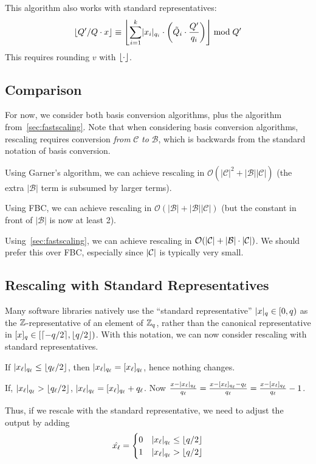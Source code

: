 \documentclass[../../fheimpl.tex]{subfiles}
\begin{document}
This algorithm also works with standard representatives:
\[\floor{Q'/Q\cdot x} \equiv \floor*{\sum_{i=1}^k \abs{x_i}_{q_i}\cdot\parens*{\tilde{Q}_i\cdot\frac{Q'}{q_i}}} \bmod Q'\]
This requires rounding $v$ with $\floor{\cdot}$.

\subsection{Comparison}
For now, we consider both basis conversion algorithms, plus the algorithm from~\cref{sec:fastscaling}. Note that when considering basis conversion algorithms, rescaling requires conversion \emph{from} $\mathcal{C}$ \emph{to} $\mathcal{B}$, which is backwards from the standard notation of basis conversion.

Using Garner's algorithm, we can achieve rescaling in $\mathcal{O}(|\mathcal{C}|^2+|\mathcal{B}||\mathcal{C}|)$ (the extra $|\mathcal{B}|$ term is subsumed by larger terms).

Using FBC, we can achieve rescaling in $\mathcal{O}(|\mathcal{B}|+|\mathcal{B}||\mathcal{C}|)$ (but the constant in front of $|\mathcal{B}|$ is now at least 2).

Using~\cref{sec:fastscaling}, we can achieve rescaling in $\mathcal{O}(\abs{\mathcal{C}}+\abs{\mathcal{B}}\cdot \abs{\mathcal{C}})$. We should prefer this over FBC, especially since $\abs{\mathcal{C}}$ is typically very small.

\subsection{Rescaling with Standard Representatives}
Many software libraries natively use the ``standard representative'' $\abs{x}_q\in [0, q)$ as the $\Z$-representative of an element of $\Z_q$, rather than the canonical representative in $\bracks{x}_q\in [\ceil{-q/2}, \floor{q/2})$. With this notation, we can now consider rescaling with standard representatives.

If $\abs{x_\ell}_{q_\ell} \le \floor{q_\ell/2}$, then $\abs{x_\ell}_{q_\ell}=\bracks{x_\ell}_{q_\ell}$, hence nothing changes. 

If, $\abs{x_\ell}_{q_\ell} > \floor{q_\ell/2}$, $\abs{x_\ell}_{q_\ell} = \bracks{x_\ell}_{q_\ell}+q_\ell$. Now $\frac{x-\abs{x_\ell}_{q_\ell}}{q_\ell} = \frac{x-\bracks{x_\ell}_{q_\ell}-q_\ell}{q_\ell} = \frac{x-\bracks{x_\ell}_{q_\ell}}{q_\ell} - 1$.

Thus, if we rescale with the standard representative, we need to adjust the output by adding 
\[\hat{x_\ell} = \begin{cases}
	0 & \abs{x_\ell}_{q_\ell} \le \floor{q/2} \\
	1 & \abs{x_\ell}_{q_\ell} > \floor{q/2}
\end{cases}\]
\end{document}
